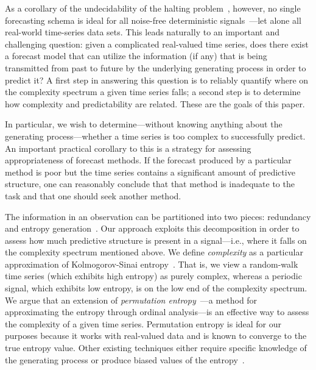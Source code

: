 As a corollary of the undecidability of the halting
problem~\cite{halting-problem}, however, no single forecasting schema
is ideal for all noise-free deterministic
signals~\cite{weigend-book}---let alone all real-world time-series
data sets.  This leads naturally to an important and challenging
question: given a complicated real-valued time series, does there
exist a forecast model that can utilize the information (if any) that
is being transmitted from past to future by the underlying generating
process \alert{in order to predict it}?  A first step in answering this question is to reliably
quantify where on the complexity spectrum a given time series falls; a
second step is to determine how complexity and predictability are
related.  These are the goals of this paper.

In particular, we wish to determine---without knowing anything about
the generating process---whether a time series is too complex to successfully
predict.  An important practical corollary to this is a strategy for
assessing appropriateness of forecast methods.  If the forecast
produced by a particular method is poor but the time series contains a
significant amount of predictive structure, one can reasonably conclude that that method is inadequate
to the task and that one should seek another method.    

The information in an observation can be partitioned into two pieces:
redundancy and entropy generation~\cite{crutchfield2003}.  
\label{page:redundancy}
Our approach exploits this decomposition in order to assess how much
predictive structure is present in a signal---i.e., where it falls on
the complexity spectrum mentioned above.  We define \emph{complexity}
as a particular approximation of Kolmogorov-Sinai
entropy~\cite{lind95}.  That is, we view a random-walk time series
(which exhibits high entropy) as purely complex, whereas a periodic
signal, which exhibits low entropy, is on the low end of the
complexity spectrum.  We argue that an extension of \emph{permutation
  entropy}~\cite{bandt2002per}---a method for approximating the
entropy through ordinal analysis---is an effective way to assess the
complexity of a given time series.  Permutation entropy is ideal for
our purposes because it works with real-valued data and is known to
converge to the true entropy value. Other existing techniques either
require specific knowledge of the generating process or produce biased
values of the entropy~\cite{bollt2001}.

